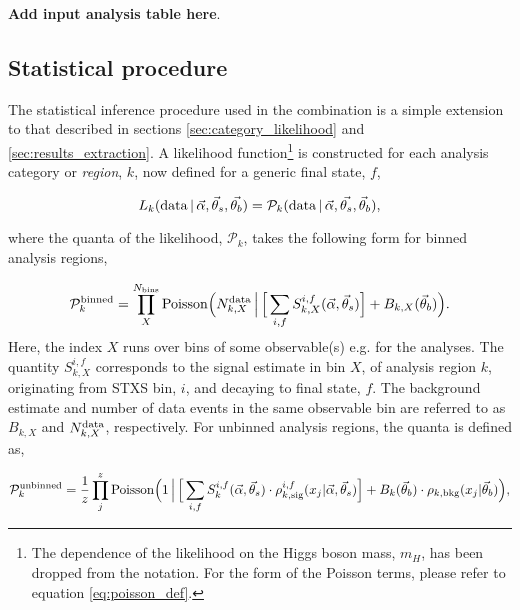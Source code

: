 \textbf{Add input analysis table here}.

\subsection{Statistical procedure}

The statistical inference procedure used in the combination is a simple extension to that described in sections \ref{sec:category_likelihood} and \ref{sec:results_extraction}. A likelihood function\footnote{The dependence of the likelihood on the Higgs boson mass, $m_H$, has been dropped from the notation. For the form of the Poisson terms, please refer to equation \ref{eq:poisson_def}.} is constructed for each analysis category or \textit{region}, $k$, now defined for a generic final state, $f$,

\begin{equation}
    L_k({\rm{data}}\,|\,\vec{\alpha},\vec{\theta}_s,\vec{\theta_b}) = \mathcal{P}_k( {\rm{data}}\,|\,\vec{\alpha},\vec{\theta_s},\vec{\theta}_b),
\end{equation}

\noindent
where the quanta of the likelihood, $\mathcal{P}_k$, takes the following form for binned analysis regions,

\begin{equation}
    \mathcal{P}^{\rm{binned}}_k = \prod^{N_{\rm{bins}}}_X {\rm{Poisson}}\Big( N^{\rm{data}}_{k,X} \, \Big| \, \Big[\sum_{i,f} S^{i,f}_{k,X}(\vec{\alpha},\vec{\theta}_s) \Big] + B_{k,X}(\vec{\theta}_b) \Big).  
\end{equation}
\noindent
Here, the index $X$ runs over bins of some observable(s) e.g. \mgg for the \Hgg analyses. The quantity $S^{i,f}_{k,X}$ corresponds to the signal estimate in bin $X$, of analysis region $k$, originating from STXS bin, $i$, and decaying to final state, $f$. The background estimate and number of data events in the same observable bin are referred to as $B_{k,X}$ and $N^{\rm{data}}_{k,X}$, respectively. For unbinned analysis regions, the quanta is defined as,

\begin{equation}
    \mathcal{P}^{\rm{unbinned}}_k = \frac{1}{z} \prod^{z}_j {\rm{Poisson}}\Big(1 \, \Big| \, \Big[\sum_{i,f} S^{i,f}_{k}(\vec{\alpha},\vec{\theta}_s) \cdot \rho^{i,f}_{k,{\rm{sig}}}(x_j|\vec{\alpha},\vec{\theta}_s) \Big] + B_{k}(\vec{\theta}_b)\cdot \rho_{k,{\rm{bkg}}}(x_j|\vec{\theta}_b) \Big),
\end{equation}


